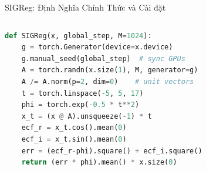 \documentclass[aspectratio=169,9pt]{beamer}
\begin{document}
\begin{frame}[fragile]{SIGReg: Định Nghĩa Chính Thức và Cài đặt}
\begin{columns}[T]
\vspace{0.2em}
\begin{mdframed}[
  topline=false,bottomline=false,rightline=false,
  linewidth=2pt,linecolor=mprimary!50,
  backgroundcolor=mdark!5,
  innerleftmargin=6pt,innerrightmargin=4pt,
  innertopmargin=4pt,innerbottommargin=4pt
]
\tiny\ttfamily
\begin{lstlisting}[language=Python,basicstyle=\tiny\ttfamily]
def SIGReg(x, global_step, M=1024):
    g = torch.Generator(device=x.device)
    g.manual_seed(global_step)  # sync GPUs
    A = torch.randn(x.size(1), M, generator=g)
    A /= A.norm(p=2, dim=0)    # unit vectors
    t = torch.linspace(-5, 5, 17)
    phi = torch.exp(-0.5 * t**2)
    x_t = (x @ A).unsqueeze(-1) * t
    ecf_r = x_t.cos().mean(0)
    ecf_i = x_t.sin().mean(0)
    err = (ecf_r-phi).square() + ecf_i.square()
    return (err * phi).mean() * x.size(0)
\end{lstlisting}
\end{mdframed}

\end{columns}
\end{frame}
\end{document}

